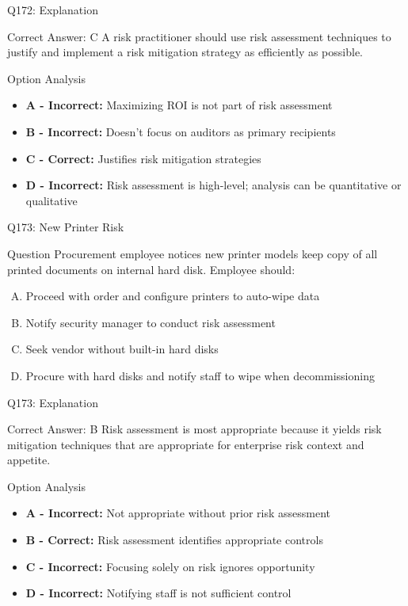 \documentclass{beamer}
\begin{document}
	\begin{frame}{Q172: Explanation}
		\begin{block}{Correct Answer: C}
			A risk practitioner should use risk assessment techniques to justify and implement a risk mitigation strategy as efficiently as possible.
		\end{block}
		\begin{block}{Option Analysis}
			\begin{itemize}
				\item \textbf{A - Incorrect:} Maximizing ROI is not part of risk assessment
				\item \textbf{B - Incorrect:} Doesn't focus on auditors as primary recipients
				\item \textbf{C - Correct:} Justifies risk mitigation strategies
				\item \textbf{D - Incorrect:} Risk assessment is high-level; analysis can be quantitative or qualitative
			\end{itemize}
		\end{block}
	\end{frame}
	
	\begin{frame}{Q173: New Printer Risk}
		\begin{block}{Question}
			Procurement employee notices new printer models keep copy of all printed documents on internal hard disk. Employee should:
		\end{block}
		\begin{enumerate}[(A)]
			\item Proceed with order and configure printers to auto-wipe data
			\item Notify security manager to conduct risk assessment
			\item Seek vendor without built-in hard disks
			\item Procure with hard disks and notify staff to wipe when decommissioning
		\end{enumerate}
	\end{frame}
	
	\begin{frame}{Q173: Explanation}
		\begin{block}{Correct Answer: B}
			Risk assessment is most appropriate because it yields risk mitigation techniques that are appropriate for enterprise risk context and appetite.
		\end{block}
		\begin{block}{Option Analysis}
			\begin{itemize}
				\item \textbf{A - Incorrect:} Not appropriate without prior risk assessment
				\item \textbf{B - Correct:} Risk assessment identifies appropriate controls
				\item \textbf{C - Incorrect:} Focusing solely on risk ignores opportunity
				\item \textbf{D - Incorrect:} Notifying staff is not sufficient control
			\end{itemize}
		\end{block}
	\end{frame}
	
\end{document}
